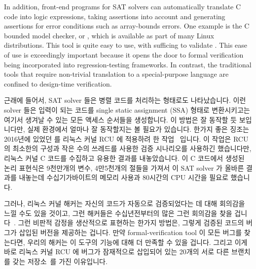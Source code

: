 In addition, front-end programs for SAT solvers can automatically translate
C code into logic expressions, taking assertions into account and generating
assertions for error conditions such as array-bounds errors.
One example is the C bounded model checker, or , which is
available as part of many Linux distributions.
This tool is quite easy to use, with  sufficing to
validate .
This ease of use is exceedingly important because it opens the door
to formal verification being incorporated into regression-testing
frameworks.
In contrast, the traditional tools that require non-trivial translation
to a special-purpose language are confined to design-time verification.
\fi

근래에 들어서, SAT solver 들은 병렬 코드를 처리하는 형태로도 나타났습니다.
이런 solver 들은 입력이 되는 코드를 single static assignment (SSA) 형태로
변환시키고는 여기서 생겨날 수 있는 모든 액세스 순서들을 생성합니다.
이 방법은 잘 동작할 듯 보입니다만, 실제 환경에서 얼마나 잘 동작할지는 볼 필요가
있습니다.
한가지 좋은 징조는 2016년에 있었던  를 리눅스 커널 RCU 에 적용하려 한
작업~\cite{LihaoLiang2016VerifyTreeRCU,LanceRoy2017CBMC-SRCU} 입니다.
이 작업은 RCU 의 최소한의 구성과 작은 수의 쓰레드를 사용한 검증 시나리오를
사용하긴 했습니다만, 리눅스 커널 C 코드를 수집하고 유용한 결과를 내놓았습니다.
이 C 코드에서 생성된 논리 표현식은 9천만개의 변수, 4만5천개의 절들을 가져서 이
SAT solver 가 올바른 결과를 내놓는데 수십기가바이트의 메모리 사용과 80시간의
CPU 시간을 필요로 했습니다.
\iffalse

More recently, SAT solvers have appeared that handle parallel code.
These solvers operate by converting the input code into single static
assignment (SSA) form, then generating all permitted access orders.
This approach seems promising, but it remains to be seen how well
it works in practice.
One encouraging sign is work in 2016 applying \co{cbmc} to Linux-kernel
RCU~\cite{LihaoLiang2016VerifyTreeRCU,LanceRoy2017CBMC-SRCU}.
This work used minimal configurations of RCU, and verified scenarios
using small numbers of threads, but nevertheless successfully ingested
Linux-kernel C code and produced a useful result.
The logic expressions generated from the C code had up to 90~million
variables, 450~million clauses, occupied tens of gigabytes of memory,
and required up to 80~hours of CPU time for the SAT solver to produce
the correct result.
\fi

그러나, 리눅스 커널 해커는 자신의 코드가 자동으로 검증되었다는 데 대해 회의감을
느낄 수도 있을 것이고, 그런 해커들은 수십년전부터의 많은 그런 회의감을 찾을
겁니다~\cite{DeMillo:1979:SPP:359104.359106}.
그런 비판적 감정을 생산적으로 표현하는 한가지 방법은, 그렇게 검증된 코드의
버그가 삽입된 버전을 제공하는 겁니다.
만약 formal-verification tool 이 모든 버그를 찾는다면, 우리의 해커는 이 도구의
기능에 대해 더 만족할 수 있을 겁니다.
그리고 이게 바로 리눅스 커널 RCU 에 버그가 잠재적으로 삽입되어 있는 20개의 서로
다른 브랜치를 갖는 
저장소~\cite{PaulEMcKenney2017VerificationChallenge6}를 가진 이유입니다.

